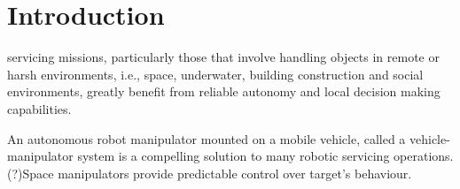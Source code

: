 \documentclass[lettersize,journal]{IEEEtran}
\theoremstyle{remark}
\begin{document}
\begin{IEEEkeywords}

\end{IEEEkeywords}


\section{Introduction}

 servicing missions, particularly those that involve handling objects in remote or harsh environments, i.e., space\cite{moghaddam2021guidance}, underwater, building construction \cite{gawel2019fully,vstibinger2021mobile} and social environments, greatly benefit from reliable autonomy and local decision making capabilities.


An autonomous robot manipulator mounted on a mobile vehicle, called a vehicle-manipulator system is a compelling solution to many robotic servicing operations\cite{Flores-abad2007}. 
(?)Space manipulators provide predictable control over target's behaviour.
\end{document}
